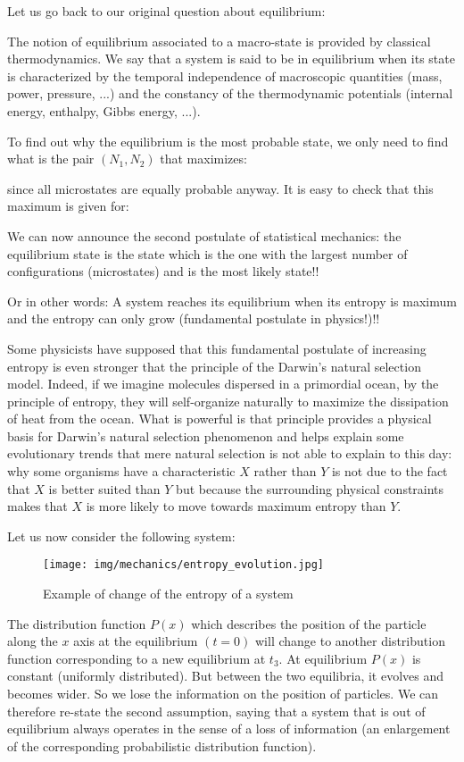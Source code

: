 	Let us go back to our original question about equilibrium:
	
	The notion of equilibrium associated to a macro-state is provided by classical thermodynamics. We say that a system is said to be in equilibrium when its state is characterized by the temporal independence of macroscopic quantities (mass, power, pressure, ...) and the constancy of the thermodynamic potentials (internal energy, enthalpy, Gibbs energy, ...).
	
	To find out why the equilibrium is the most probable state, we only need to find what is the pair $(N_1,N_2)$ that maximizes:
	
	since all microstates are equally probable anyway. It is easy to check that this maximum is given for:
	
	We can now announce the second postulate of statistical mechanics: the equilibrium state is the state which is the one with the largest number of configurations (microstates) and is the most likely state!!
	
	Or in other words: A system reaches its equilibrium when its entropy is maximum and the entropy can only grow (fundamental postulate in physics!)!!
	
	\begin{tcolorbox}[title=Remark,colframe=black,arc=10pt]
	Some physicists have supposed that this fundamental postulate of increasing entropy is even stronger that the principle of the Darwin's natural selection model. Indeed, if we imagine molecules dispersed in a primordial ocean, by the principle of entropy, they will self-organize naturally to maximize the dissipation of heat from the ocean. What is powerful is that principle provides a physical basis for Darwin's natural selection phenomenon and helps explain some evolutionary trends that mere natural selection is not able to explain to this day: why some organisms have a characteristic $X$ rather than $Y$ is not due to the fact that $X$ is better suited than $Y$ but because the surrounding physical constraints makes that $X$ is more likely to move towards maximum entropy than $Y$.
	\end{tcolorbox}
	
	\pagebreak
	Let us now consider the following system:
	\begin{figure}[H]
		\centering
		\texttt{[image: img/mechanics/entropy\_evolution.jpg]}
		\caption{Example of change of the entropy of a system}
	\end{figure}
	The distribution function $P (x)$ which describes the position of the particle along the $x$ axis at the equilibrium $(t=0)$ will change to another distribution function corresponding to a new equilibrium at $t_3$. At equilibrium $P (x)$ is constant (uniformly distributed). But between the two equilibria, it evolves and becomes wider. So we lose the information on the position of particles. We can therefore re-state the second assumption, saying that a system that is out of equilibrium always operates in the sense of a loss of information (an enlargement of the corresponding probabilistic distribution function).
	
